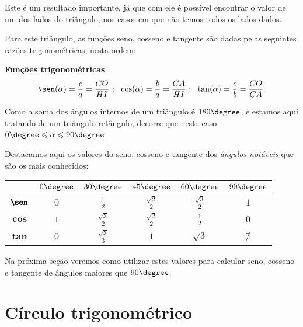  Este é um resultado importante, já que com ele é possível encontrar o valor de um dos lados do triângulo, nos casos em que não temos todos os lados dados.

 Para este triângulo, as funções seno, cosseno e tangente são dadas pelas seguintes razões trigonométricas, nesta ordem:

 \vskip0.3cm

\colorbox{azul}{
 \begin{minipage}{0.9\linewidth}
 \begin{center}
 \textbf{Funções trigonométricas}
  \begin{eqnarray*}
   \sen(\alpha)= \frac{c}{a}= \frac{CO}{HI} \ ; \ \
   \cos(\alpha)= \frac{b}{a}= \frac{CA}{HI} \ ; \ \
   \tan(\alpha)= \frac{c}{b}= \frac{CO}{CA}.
 \end{eqnarray*}
 \end{center}
 \end{minipage}}

 \vskip0.3cm

 Como a soma dos ângulos internos de um triângulo é $180 \degree$, e estamos aqui tratando de um triângulo retângulo, decorre que neste caso $0 \degree \leqslant \alpha \leqslant 90 \degree$. 
 
 Destacamos aqui os valores do seno, cosseno e tangente dos \emph{ângulos notáveis} que são os mais conhecidos:

 \begin{table}[H]
 \centering
 \begin{tabular}{|c|c|c|c|c|c|} \hline
 \rowcolor{cinza}
               & $0 \degree$  & $30 \degree$  & $45 \degree$  & $60 \degree$ & $90 \degree$  \\\hline
  $\pmb{\sen}$ & $0$ &$\frac{1}{2}$ & $\frac{\sqrt{2}}{2}$ & $\frac{\sqrt{3}}{2}$ & $1$ \\\hline
  $\pmb{\cos}$ & $1$ & $\frac{\sqrt{3}}{2}$ & $\frac{\sqrt{2}}{2}$ & $\frac{1}{2}$ & $0$ \\\hline
  $\pmb{\tan}$ & $0$ & $\frac{\sqrt{3}}{3}$ & $1$ & $\sqrt{3}$ & $\nexists$ \\\hline
 \end{tabular}
\end{table}
 Na próxima seção veremos como utilizar estes valores para calcular seno, cosseno e tangente de ângulos maiores que $90 \degree$.

\section{Círculo trigonométrico}

